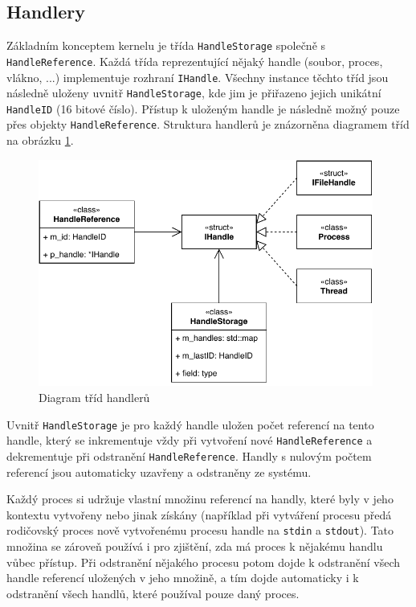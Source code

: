 \documentclass[11pt,a4paper]{scrartcl}
\begin{document}
	\subsection{Handlery}
	
	Základním konceptem kernelu je třída \verb|HandleStorage| společně s \verb|HandleReference|. Každá třída reprezentující nějaký handle (soubor, proces, vlákno, ...) implementuje rozhraní \verb|IHandle|. Všechny instance těchto tříd jsou následně uloženy uvnitř \verb|HandleStorage|, kde jim je přiřazeno jejich unikátní \verb|HandleID| (16 bitové číslo). Přístup k uloženým handle je následně možný pouze přes objekty \verb|HandleReference|. Struktura handlerů je znázorněna diagramem tříd na obrázku \ref{fig:handle-class-d}.
	
	\begin{figure}[H]
		\centering
		\includegraphics[width=11cm]{handle-class-d.pdf}
		\caption{Diagram tříd handlerů}
		\label{fig:handle-class-d}
	\end{figure}
	
	Uvnitř \verb|HandleStorage| je pro každý handle uložen počet referencí na tento handle, který se inkrementuje vždy při vytvoření nové \verb|HandleReference| a dekrementuje při odstranění \verb|HandleReference|. Handly s nulovým počtem referencí jsou automaticky uzavřeny a odstraněny ze systému. 
	
	Každý proces si udržuje vlastní množinu referencí na handly, které byly v jeho kontextu vytvořeny nebo jinak získány (například při vytváření procesu předá rodičovský proces nově vytvořenému procesu handle na \verb|stdin| a \verb|stdout|). Tato množina se zároveň používá i pro zjištění, zda má proces k nějakému handlu vůbec přístup. Při odstranění nějakého procesu potom dojde k odstranění všech handle referencí uložených v jeho množině, a tím dojde automaticky i k odstranění všech handlů, které používal pouze daný proces. 
	
\end{document}
